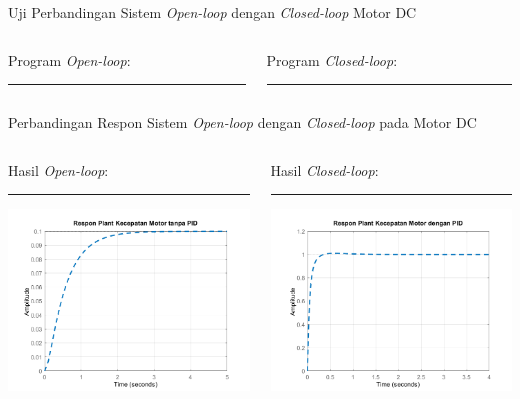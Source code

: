 \documentclass[10pt,xcolor={dvipsnames}]{beamer}
\begin{document}
		\begin{frame}{Uji Perbandingan Sistem \textit{Open-loop} dengan \textit{Closed-loop} Motor DC}
			\begin{columns}[T] %
				\begin{column}{0.48\textwidth}
					Program \textit{Open-loop}:
					\color{black}\rule{\linewidth}{4pt}
					
				\end{column}%
				\hfill%
				\begin{column}{0.48\textwidth}
					Program \textit{Closed-loop}:
					\color{blue}\rule{\linewidth}{4pt}
					
				\end{column}
			\end{columns}
		\end{frame}	
		\begin{frame}{Perbandingan Respon Sistem \textit{Open-loop} dengan \textit{Closed-loop} pada Motor DC}
			\begin{columns}[T] %
				\begin{column}{0.48\textwidth}
					Hasil \textit{Open-loop}:\newline
					\color{black}\rule{\linewidth}{4pt}
					\includegraphics[width=7.5cm]{Matlab/olDCSpeed.png}
				\end{column}%
				\hfill%
				\begin{column}{0.48\textwidth}
					Hasil \textit{Closed-loop}:\newline
					\color{blue}\rule{\linewidth}{4pt}
					\includegraphics[width=7.5cm]{Matlab/clDCSpeed.png}
				\end{column}
			\end{columns}
		\end{frame}		
\end{document}
